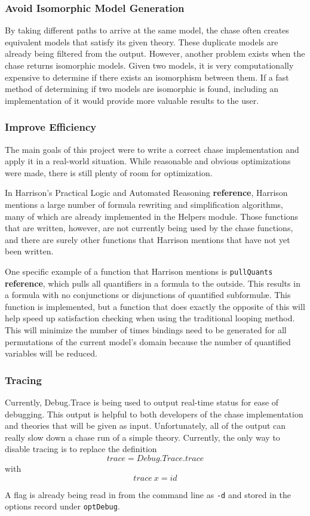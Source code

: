 		\subsubsection{Avoid Isomorphic Model Generation}

			By taking different paths to arrive at the same model, the chase
			often creates equivalent models that satisfy its given theory.
			These duplicate models are already being filtered from the output.
			However, another problem exists when the chase returns isomorphic
			models. Given two models, it is very computationally expensive to
			determine if there exists an isomorphism between them. If a fast
			method of determining if two models are isomorphic is found,
			including an implementation of it would provide more valuable
			results to the user.

		\subsubsection{Improve Efficiency}

			The main goals of this project were to write a correct chase
			implementation and apply it in a real-world situation. While
			reasonable and obvious optimizations were made, there is still
			plenty of room for optimization.

			In Harrison's Practical Logic and Automated Reasoning
			\textbf{reference}, Harrison mentions a large number of formula
			rewriting and simplification algorithms, many of which are already
			implemented in the Helpers module. Those functions that are
			written, however, are not currently being used by the chase
			functions, and there are surely other functions that Harrison
			mentions that have not yet been written.

			One specific example of a function that Harrison mentions is
			{\tt pullQuants} \textbf{reference}, which pulls all quantifiers in
			a formula to the outside. This results in a formula with no
			conjunctions or disjunctions of quantified subformul{\ae}. This
			function is implemented, but a function that does exactly the
			opposite of this will help speed up satisfaction checking when
			using the traditional looping method. This will minimize the number
			of times bindings need to be generated for all permutations of the
			current model's domain because the number of quantified variables
			will be reduced.

		\subsubsection{Tracing}

			Currently, Debug.Trace is being used to output real-time status for
			ease of debugging.  This output is helpful to both developers of
			the chase implementation and theories that will be given as input.
			Unfortunately, all of the output can really slow down a chase run
			of a simple theory.  Currently, the only way to disable tracing is
			to replace the definition \[trace = Debug.Trace.trace\] with
			\[trace\ x = id\]

			A flag is already being read in from the command line as {\tt -d}
			and stored in the options record under {\tt optDebug}.

